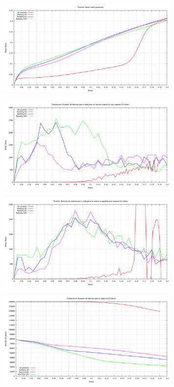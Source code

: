\documentclass[10pt, oneside]{article} %
\begin{document}
\begin{figure}[H]
\centering
\includegraphics[width=9cm]{Figures/Porosidad/Porosidad_ss_2.png}
\caption{}
\end{figure}

\begin{figure}[H]
\centering
\includegraphics[width=9cm]{Figures/Porosidad/Porosidad_ss_3.png}
\caption{}
\end{figure}

\begin{figure}[H]
\centering
\includegraphics[width=9cm]{Figures/Porosidad/Porosidad_ss_4.png}
\caption{}
\end{figure}

\begin{figure}[H]
\centering
\includegraphics[width=9cm]{Figures/Porosidad/Porosidad_ss_5.png}
\caption{}
\end{figure}
\end{document}
